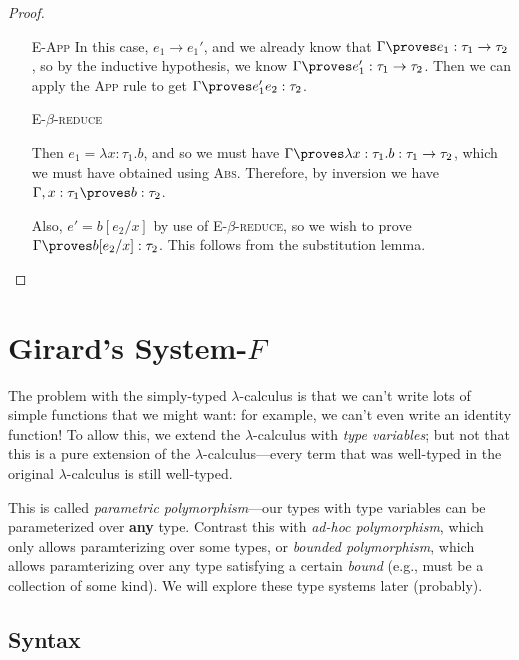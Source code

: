 \documentclass[10pt]{article}
\begin{document}
\begin{proof}
    \begin{itemize}
        \item[\textsc{E-App}] In this case, $e_1 \to e_1'$, and we already know that $\Gamma \proves e_1 : \tau_1 \to \tau_2$, so by the inductive hypothesis, we know $\Gamma \proves e_1' : \tau_1 \to \tau_2$.
            Then we can apply the \textsc{App} rule to get $\Gamma \proves e_1' e_2 : \tau_2$.

        \item[\textsc{E-$\beta$-reduce}]

            Then $e_1 = \lambda x : \tau_1. b$, and so we must have $\Gamma \proves \lambda x : \tau_1 . b : \tau_1 \to \tau_2$, which we must have obtained using \textsc{Abs}.
            Therefore, by inversion we have $\Gamma, x : \tau_1 \proves b : \tau_2$.

            Also, $e' = b[e_2/x]$ by use of \textsc{E-$\beta$-reduce}, so we wish to prove $\Gamma \proves b[e_2/x] : \tau_2$.
            This follows from the substitution lemma.
    \end{itemize}

\end{proof}

\section{Girard's System-$F$}

The problem with the simply-typed $\lambda$-calculus is that we can't write lots of simple functions that we might want: for example, we can't even write an identity function!
To allow this, we extend the $\lambda$-calculus with \emph{type variables}; but not that this is a pure extension of the $\lambda$-calculus---every term that was well-typed in the original $\lambda$-calculus is still well-typed.

This is called \emph{parametric polymorphism}---our types with type variables can be parameterized over \textbf{any} type.
Contrast this with \emph{ad-hoc polymorphism}, which only allows paramterizing over some types, or \emph{bounded polymorphism}, which allows paramterizing over any type satisfying a certain \emph{bound} (e.g., must be a collection of some kind).
We will explore these type systems later (probably).

\subsection{Syntax}
\end{document}
